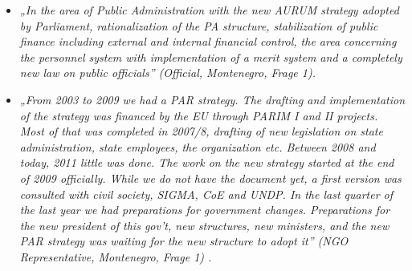 \begin{itemize}[label={}]
\item \textit{„In the area of Public Administration with the new AURUM strategy adopted by Parliament, rationalization of the PA structure, stabilization of public finance including external and internal financial control, the area concerning the personnel system with implementation of a merit system and a completely new law on public officials” (Official, Montenegro, Frage 1). }
\item \textit{„From 2003 to 2009 we had a PAR strategy. The drafting and implementation of the strategy was financed by the EU through PARIM I and II projects. Most of that was completed in 2007/8, drafting of new legislation on state administration, state employees, the organization etc. Between 2008 and today, 2011 little was done. The work on the new strategy started at the end of 2009 officially. While we do not have the document yet, a first version was consulted with civil society, SIGMA, CoE and UNDP. In the last quarter of the last year we had preparations for government changes. Preparations for the new president of this gov’t, new structures, new ministers, and the new PAR strategy was waiting for the new structure to adopt it” (NGO Representative, Montenegro, Frage 1) . }
\end{itemize}



